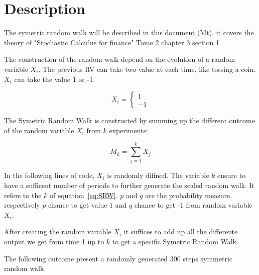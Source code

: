 \documentclass{article}
\begin{document}


\section{Description}
The symetric random walk will be described in this document (Mt). it covers the theory of "Stochastic Calculus for finance" Tome 2 chapter 3 section 1.

The construction of the random walk depend on the evolution of a random variable $X_i$. The previous RV can take two value at each time, like tossing a coin. $X_i$ can take the value 1 or -1.

\begin{equation}
 \label{eq:Xi}
X_i = 
\left \{{
  \begin{array}{c} 1 \\ -1 \end{array}
  }\right .
\end{equation}
 
The Symetric Random Walk is constructed by summing up the different outcome of the random variable $X_i$ from $k$ experiments:

\begin{equation}
\label{eq:SRW}
M_k = 
\sum_{j=1}^k X_j
\end{equation}

In the following lines of code, $X_i$ is randomly difined. The variable $k$ ensure to have a sufficent number of periods to further generate the scaled random walk.
It refers to the $k$ of equation~\ref{eq:SRW}.
$p$ and $q$ are the probability measure, respectively $p$ chance to get value 1 and $q$ chance to get -1 from random variable $X_i$.




After creating the random variable $X_i$ it suffices to add up all the differente output we get from time 1 up to $k$ to get a specific Symetric Random Walk.

The following outcome present a randomly generated 300 steps symmetric random walk.
\end{document}
